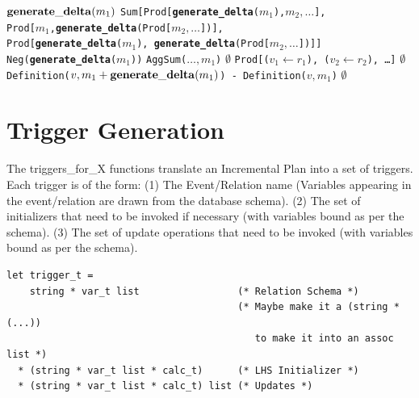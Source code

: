 \documentclass[11pt]{amsart}
\newcommand{\parsection}[1]{\smallskip\noindent{\bf #1.}}
\begin{document}
\parsection{generate\_delta}
\begin{algorithmic}
   {${\bf generate\_delta}(m_1)$}
   {\tt Sum[Prod[{\bf generate\_delta}($m_1$),$m_2,\ldots$], \\
  \hspace*{1in}Prod[$m_1$,{\bf generate\_delta}(Prod[$m_2,\ldots$])], \\
  \hspace*{1in}Prod[{\bf generate\_delta}($m_1$), {\bf generate\_delta}(Prod[$m_2,\ldots$])]]}
   {\tt Neg({\bf generate\_delta}($m_1$))}
   {\tt AggSum($\ldots, m_1$)}
   $\emptyset$
   {\tt Prod[($v_1 \leftarrow r_1$), ($v_2 \leftarrow r_2$), \ldots]}
   $\emptyset$
   
   {\tt Definition($v,m_1+{\bf generate\_delta}(m_1)$) - Definition($v,m_1$)}
   $\emptyset$
\ENDIF

\end{algorithmic}

\section{Trigger Generation}

The triggers\_for\_X functions translate an Incremental Plan into a set of triggers.  Each trigger is of the form: (1) The Event/Relation name (Variables appearing in the event/relation are drawn from the database schema).  (2) The set of initializers that need to be invoked if necessary (with variables bound as per the schema).  (3) The set of update operations that need to be invoked (with variables bound as per the schema).

\begin{verbatim}
let trigger_t = 
    string * var_t list                 (* Relation Schema *)
                                        (* Maybe make it a (string * (...))
                                           to make it into an assoc list *)
  * (string * var_t list * calc_t)      (* LHS Initializer *)
  * (string * var_t list * calc_t) list (* Updates *)
\end{verbatim}
\end{document}

